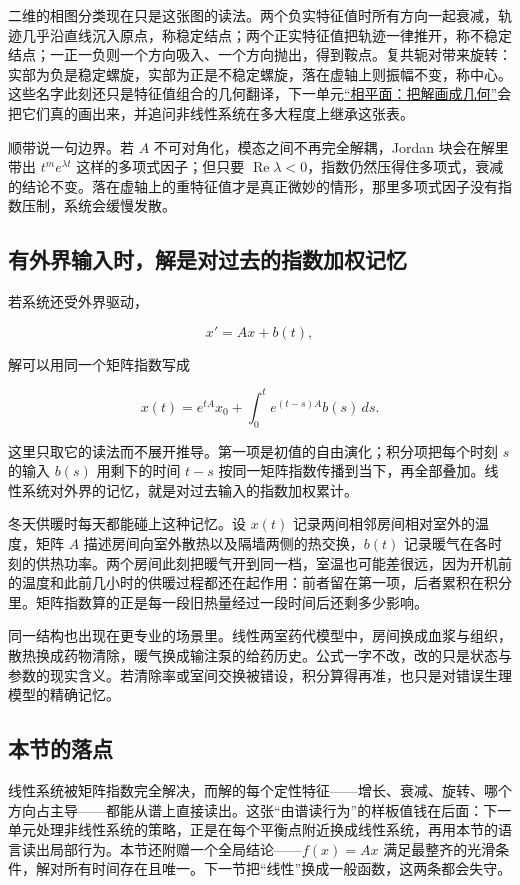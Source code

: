 二维的相图分类现在只是这张图的读法。两个负实特征值时所有方向一起衰减，轨迹几乎沿直线沉入原点，称稳定结点；两个正实特征值把轨迹一律推开，称不稳定结点；一正一负则一个方向吸入、一个方向抛出，得到鞍点。复共轭对带来旋转：实部为负是稳定螺旋，实部为正是不稳定螺旋，落在虚轴上则振幅不变，称中心。这些名字此刻还只是特征值组合的几何翻译，下一单元\hyperref[sec:15-Differential-Equations-and-Dynamical-Systems/02-Stability-and-Dynamical-Systems/01]{``相平面：把解画成几何''}会把它们真的画出来，并追问非线性系统在多大程度上继承这张表。

顺带说一句边界。若 \(A\) 不可对角化，模态之间不再完全解耦，Jordan 块会在解里带出 \(t^{m}e^{\lambda t}\) 这样的多项式因子；但只要 \(\operatorname{Re}\lambda<0\)，指数仍然压得住多项式，衰减的结论不变。落在虚轴上的重特征值才是真正微妙的情形，那里多项式因子没有指数压制，系统会缓慢发散。

\subsection{有外界输入时，解是对过去的指数加权记忆}

若系统还受外界驱动，

\[
x'=Ax+b(t),
\]

解可以用同一个矩阵指数写成

\[
x(t)=e^{tA}x_0+\int_0^t e^{(t-s)A}b(s)\,ds.
\]

这里只取它的读法而不展开推导。第一项是初值的自由演化；积分项把每个时刻 \(s\) 的输入 \(b(s)\) 用剩下的时间 \(t-s\) 按同一矩阵指数传播到当下，再全部叠加。线性系统对外界的记忆，就是对过去输入的指数加权累计。

冬天供暖时每天都能碰上这种记忆。设 \(x(t)\) 记录两间相邻房间相对室外的温度，矩阵 \(A\) 描述房间向室外散热以及隔墙两侧的热交换，\(b(t)\) 记录暖气在各时刻的供热功率。两个房间此刻把暖气开到同一档，室温也可能差很远，因为开机前的温度和此前几小时的供暖过程都还在起作用：前者留在第一项，后者累积在积分里。矩阵指数算的正是每一段旧热量经过一段时间后还剩多少影响。

同一结构也出现在更专业的场景里。线性两室药代模型中，房间换成血浆与组织，散热换成药物清除，暖气换成输注泵的给药历史。公式一字不改，改的只是状态与参数的现实含义。若清除率或室间交换被错设，积分算得再准，也只是对错误生理模型的精确记忆。

\subsection{本节的落点}

线性系统被矩阵指数完全解决，而解的每个定性特征——增长、衰减、旋转、哪个方向占主导——都能从谱上直接读出。这张``由谱读行为''的样板值钱在后面：下一单元处理非线性系统的策略，正是在每个平衡点附近换成线性系统，再用本节的语言读出局部行为。本节还附赠一个全局结论——\(f(x)=Ax\) 满足最整齐的光滑条件，解对所有时间存在且唯一。下一节把``线性''换成一般函数，这两条都会失守。
